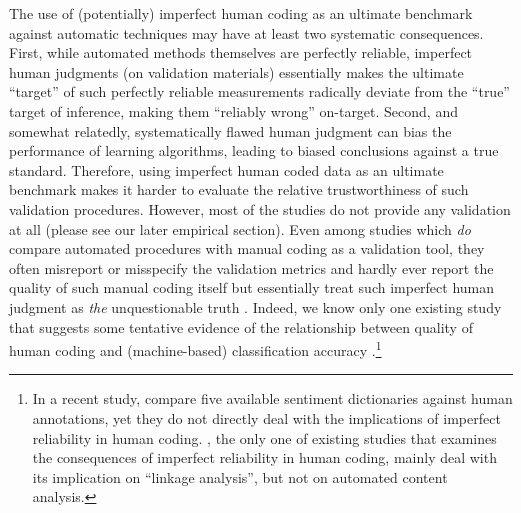 \documentclass[man, floatsintext, 12pt, a4paper, noextraspace]{apa6}
\begin{document}
    The use of (potentially) imperfect human coding as an ultimate benchmark against automatic techniques may have at least two systematic consequences. First, while automated methods themselves are perfectly reliable, imperfect human judgments (on validation materials) essentially makes the ultimate \enquote{target} of such perfectly reliable measurements radically deviate from the \enquote{true} target of inference, making them \enquote{reliably wrong} on-target. Second, and somewhat relatedly, systematically flawed human judgment can bias the performance of learning algorithms, leading to biased conclusions against a true standard. Therefore, using imperfect human coded data as an ultimate benchmark makes it harder to evaluate the relative trustworthiness of such validation procedures. However, most of the studies do not provide any validation at all (please see our later empirical section). Even among studies which \textit{do} compare automated procedures with manual coding as a validation tool, they often misreport or misspecify the validation metrics and hardly ever report the quality of such manual coding itself but essentially treat such imperfect human judgment as \textit{the} unquestionable truth \parencites[e.g.,][]{gonzalez2015signals, lowe2013validating, YoungSoroka2012}. Indeed, we know only one existing study that suggests some tentative evidence of the relationship between quality of human coding and (machine-based) classification accuracy \parencite{burscher2014teaching}.\footnote{ In a recent study, \textcite{gonzalez2015signals} compare five available sentiment dictionaries against human annotations, yet they do not directly deal with the implications of imperfect reliability in human coding. \textcite{scharkow2017measurement}, the only one of existing studies that examines the consequences of imperfect reliability in human coding, mainly deal with its implication on \enquote{linkage analysis}, but not on automated content analysis.}     
   
\end{document}

